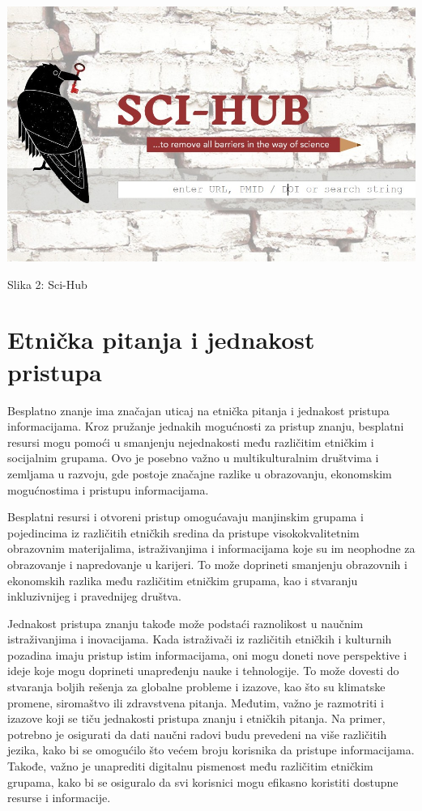 \documentclass[a4paper]{article}
\begin{document}
{\begin{center}
\includegraphics[scale=0.3]{scihub.jpg}
\end{center}
\caption{Slika 2: Sci-Hub}
\label{sci-hub}


\setlength{\parskip}{1em}


\section{Etnička pitanja i jednakost pristupa}
\label{Etnička pitanja i jednakost pristupa}


Besplatno znanje ima značajan uticaj na etnička pitanja i jednakost pristupa informacijama. Kroz pružanje jednakih mogućnosti za pristup znanju, besplatni resursi mogu pomoći u smanjenju nejednakosti među različitim etničkim i socijalnim grupama. Ovo je posebno važno u multikulturalnim društvima i zemljama u razvoju, gde postoje značajne razlike u obrazovanju, ekonomskim mogućnostima i pristupu informacijama.

Besplatni resursi i otvoreni pristup omogućavaju manjinskim grupama i pojedincima iz različitih etničkih sredina da pristupe visokokvalitetnim obrazovnim materijalima, istraživanjima i informacijama koje su im neophodne za obrazovanje i napredovanje u karijeri. To može doprineti smanjenju obrazovnih i ekonomskih razlika među različitim etničkim grupama, kao i stvaranju inkluzivnijeg i pravednijeg društva.

Jednakost pristupa znanju takođe može podstaći raznolikost u naučnim istraživanjima i inovacijama. Kada istraživači iz različitih etničkih i kulturnih pozadina imaju pristup istim informacijama, oni mogu doneti nove perspektive i ideje koje mogu doprineti unapređenju nauke i tehnologije. To može dovesti do stvaranja boljih rešenja za globalne probleme i izazove, kao što su klimatske promene, siromaštvo ili zdravstvena pitanja. \cite{prva}
Međutim, važno je razmotriti i izazove koji se tiču jednakosti pristupa znanju i etničkih pitanja. Na primer, potrebno je osigurati da dati naučni radovi budu prevedeni na više različitih jezika, kako bi se omogućilo što većem broju korisnika da pristupe informacijama. Takođe, važno je unaprediti digitalnu pismenost među različitim etničkim grupama, kako bi se osiguralo da svi korisnici mogu efikasno koristiti dostupne resurse i informacije.



}
\end{document}
